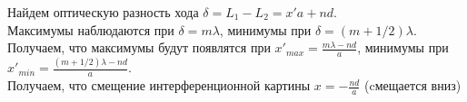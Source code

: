 \documentclass[__main__.tex]{subfiles}
\begin{document}
 Найдем оптическую разность хода $\delta = L_1 - L_2 = x'a + nd$.\\

Максимумы наблюдаются при $\delta = m\lambda$, минимумы при $\delta = (m + 1/2)\lambda$.\\

Получаем, что максимумы будут появлятся при $x'_{max} = \frac{m\lambda - nd}{a}$, минимумы при $x'_{min} = \frac{(m + 1/2)\lambda - nd}{a}.$\\

Получаем, что смещение интерференционной картины $x = -\frac{nd}{a}$ (cмещается вниз)\\
\end{document}
